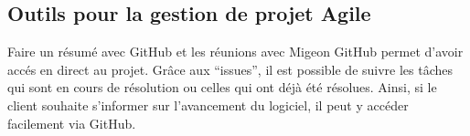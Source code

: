 \subsection{Outils pour la gestion de projet Agile}
Faire un résumé avec GitHub et les réunions avec Migeon
GitHub permet d’avoir accés en direct au projet. Grâce aux “issues”, il est possible de suivre les tâches qui sont en cours de résolution ou celles qui ont déjà été résolues. Ainsi, si le client souhaite s’informer sur l’avancement du logiciel, il peut y accéder facilement via GitHub.

